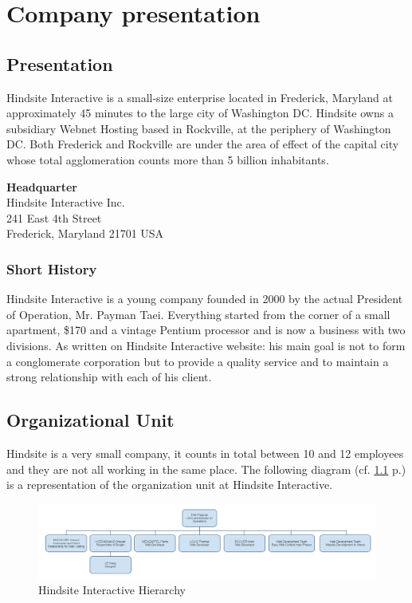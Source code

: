 \chapter{Company presentation}

\section{Presentation}

Hindsite Interactive is a small-size enterprise located in Frederick, Maryland at
approximately 45 minutes to the large city of Washington DC. Hindsite owns a
subsidiary Webnet Hosting based in Rockville, at the periphery of Washington
DC. Both Frederick and Rockville are under the area of effect of the capital
city whose total agglomeration counts more than 5 billion inhabitants.

\textbf{Headquarter} \\
Hindsite Interactive Inc.\\
241 East 4th Street\\
Frederick, Maryland 21701 USA\\

\subsection*{Short History}

Hindsite Interactive is a young company founded in 2000 by the actual
President of Operation, Mr. Payman Taei. Everything started from the corner
of a small apartment, \$170 and a vintage Pentium processor and is now a
business with two divisions. As written on Hindsite Interactive website: his main goal is not to form a conglomerate corporation but to provide a quality service and to maintain a
strong relationship with each of his client.

\section{Organizational Unit}

Hindsite is a very small company, it counts in total between 10 and 12
employees and they are not all working in the same place. The following diagram (cf. \ref{figure:organigramme} p.\pageref{figure:organigramme}) is a representation of the organization unit at Hindsite
Interactive.

\begin{figure}[ht]
\centering
\includegraphics[width=\textwidth]{img/hindsite_organigramme.png}
\caption{Hindsite Interactive Hierarchy}
\label{figure:organigramme}
\end{figure}

